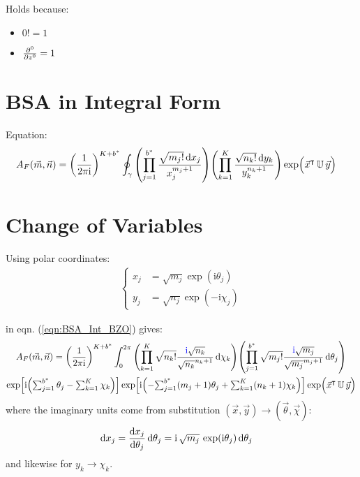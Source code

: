 \documentclass[
	english,
	a4paper,
	fontsize=10pt,
	parskip=half,
	titlepage=true,
	DIV=12,
	final
]{scrreprt}
\newcommand*{\transp}{\ensuremath{^\intercal}}
\newcommand*{\iunit}{\ensuremath{\mathrm{i}}}
\begin{document}
Holds because:
\begin{itemize}
\item $0! = 1$
\item $\pdv[0]{z} = 1$
\end{itemize}

\section{BSA in Integral Form}
Equation:
\begin{align}
	A_F(\vec{m}, \vec{n})
&=
	\qty(
		\frac{1}{2\pi\iunit}
	)^{K + b^*}
	\oint_{\gamma}
		\qty( \prod_{j=1}^{b^*}
			\frac
				{\sqrt{m_j!} \dd{x_j}}
				{x_j^{m_j+1}}
		)
		\qty( \prod_{k=1}^{K}
			\frac
				{\sqrt{n_k!} \dd{y_k}}
				{ y_k^{n_k+1} }
		)
		\exp( \Big. \vec{x}\transp \, \mathbb{U} \, \vec{y})
	\label{eqn:BSA_Int_BZO}
\end{align}

\section{Change of Variables}
Using polar coordinates:
\begin{align}
	\begin{cases}
	x_j &= \sqrt{m_j} \exp( \iunit \theta_j) \\
	y_j &= \sqrt{n_j} \exp(-\iunit \chi  _j)
	\end{cases}
	\label{eqn:DefXY}
\end{align}

in eqn. (\ref{eqn:BSA_Int_BZO}) gives:
\begin{multline}
	A_F(\vec{m}, \vec{n})
=
	\qty(
		\frac{1}{2\pi\iunit}
	)^{K + b^*}
	\int_{0}^{2\pi}
		\qty( \prod_{k=1}^{K}
			\sqrt{n_k!}
			\frac
				{ {\color{blue} \iunit} \sqrt{n_k}}
				{ \sqrt{n_k}^{n_k + 1} }
			\dd{\chi_k}
		)
		\qty( \prod_{j=1}^{b^*}
			\sqrt{m_j!}
			\frac
				{ {\color{blue} \iunit} \sqrt{m_j}}
				{ \sqrt{m_j}^{m_j + 1} }
			\dd{\theta_j}
		)
\\
	\exp[ \iunit \qty(
		{\textstyle \sum_{j=1}^{b^*} \theta_j} - 
		{\textstyle \sum_{k=1}^{K}   \chi  _k}
	)]
	\exp[
		\iunit \qty(
			-{\textstyle \sum_{j=1}^{b^*} (m_j + 1) \theta_j}
			+{\textstyle \sum_{k=1}^{K}   (n_k + 1) \chi  _k}
	)]
	\exp( \Big. \vec{x}\transp \, \mathbb{U} \, \vec{y})
\end{multline}
where the imaginary units come from substitution $(\vec{x}, \vec{y}) \to (\vec{\theta}, \vec{\chi})$:
\begin{align}
	\dd{x_j}
&=
	\dv{x_j}{\theta_j} \dd{\theta_j}
=
	\iunit \, \sqrt{m_j} \, \exp(\iunit \theta_j) \dd{\theta_j}
\end{align}
and likewise for $y_k \to \chi_k$.
\end{document}
